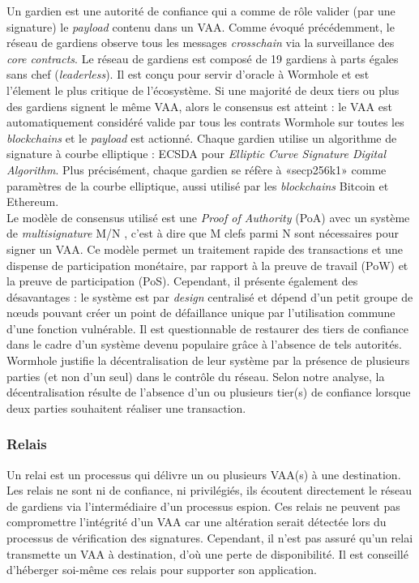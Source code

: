 Un gardien \cite{wormholeGuardian} est une autorité de confiance qui a comme de rôle valider 
(par une signature) le \textit{payload} contenu dans un VAA.
Comme évoqué précédemment, le réseau de gardiens observe tous les messages \textit{crosschain} via la 
surveillance des \textit{core contracts}.
Le réseau de gardiens est composé de 19 gardiens à parts égales sans chef (\textit{leaderless}).
Il est conçu pour servir d'oracle à Wormhole et est l'élement le plus critique de l'écosystème.
Si une majorité de deux tiers ou plus des gardiens signent le même VAA, alors le consensus est atteint : 
le VAA est automatiquement considéré valide par  tous les contrats Wormhole sur toutes les 
\textit{\gls{blockchain}s} et le \textit{payload} est actionné. 
Chaque gardien utilise un algorithme de signature à courbe elliptique : ECSDA pour 
\textit{Elliptic Curve Signature Digital Algorithm}.
Plus précisément, chaque gardien se réfère à «secp256k1» comme paramètres de la courbe elliptique, 
aussi utilisé par les \textit{\gls{blockchain}s} Bitcoin et Ethereum.\\
Le modèle de consensus utilisé est une \textit{Proof of Authority} (PoA) avec un système de 
\textit{multisignature} M/N \cite{wormholeChainswap}, c'est à dire que M clefs parmi N sont nécessaires 
pour signer un VAA. Ce modèle permet un traitement rapide des transactions et une dispense de participation monétaire, par rapport à la preuve de travail (PoW) et la preuve 
de participation (PoS). Cependant, il présente également des désavantages : le système est par 
\textit{design} centralisé et dépend d'un petit groupe de nœuds pouvant créer un point de 
défaillance unique par l'utilisation commune d'une fonction vulnérable. Il est questionnable de restaurer des tiers de confiance dans le cadre d'un système 
devenu populaire grâce à l'absence de tels autorités. Wormhole justifie la décentralisation de leur 
système \cite{wormholeGuardian} par la présence de plusieurs parties (et non d'un seul) dans le contrôle du réseau.
Selon notre analyse, la décentralisation résulte de l'absence d'un ou plusieurs tier(s) de confiance lorsque deux parties 
souhaitent réaliser une transaction.
\newpage

\subsubsection{Relais}

Un relai \cite{wormholeRelayer} est un processus qui délivre un ou plusieurs VAA(s) à une destination.
Les relais ne sont ni de confiance, ni privilégiés, ils écoutent directement le réseau de gardiens 
via l'intermédiaire d'un processus espion. Ces relais ne peuvent pas compromettre l'intégrité d'un VAA 
car une altération serait détectée lors du processus de vérification des signatures. Cependant, il n'est 
pas assuré qu'un relai transmette un VAA à destination, d'où une perte de disponibilité. Il est conseillé
d'héberger soi-même ces relais pour supporter son application.


